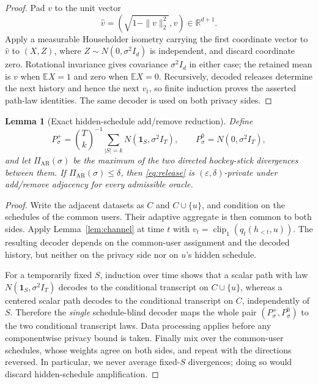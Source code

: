 \documentclass[11pt]{article}
\newtheorem{lemma}[theorem]{Lemma}
\theoremstyle{remark}
\newcommand{\R}{\mathbb{R}}
\newcommand{\clip}{\operatorname{clip}_1}
\begin{document}
\begin{proof}
Pad $v$ to the unit vector
\[
 \widehat v=(\sqrt{1-\|v\|_2^2},v)\in\R^{d+1}.
\]
Apply a measurable Householder isometry carrying the first coordinate vector
to $\widehat v$ to $(X,Z)$, where
$Z\sim N(0,\sigma^2I_d)$ is independent, and discard coordinate zero.
Rotational invariance gives covariance $\sigma^2I_d$ in either case; the
retained mean is $v$ when $\mathbb EX=1$ and zero when $\mathbb EX=0$.
Recursively, decoded releases determine the next history and hence the next
$v_t$, so finite induction proves the asserted path-law identities.  The same
decoder is used on both privacy sides.
\end{proof}

\begin{lemma}[Exact hidden-schedule add/remove reduction]\label{lem:ar-upper}
Define
\[
 P_\sigma^+
 =\binom Tk^{-1}\sum_{|S|=k}N(\mathbf1_S,\sigma^2I_T),
 \qquad
 P_\sigma^0=N(0,\sigma^2I_T),
\]
and let $\Pi_{\mathrm{AR}}(\sigma)$ be the maximum of the two directed
hockey-stick divergences between them.  If
$\Pi_{\mathrm{AR}}(\sigma)\leq\delta$, then \eqref{eq:release} is
$(\varepsilon,\delta)$-private under add/remove adjacency for every admissible
oracle.
\end{lemma}

\begin{proof}
Write the adjacent datasets as $C$ and $C\cup\{u\}$, and condition on the
schedules of the common users.  Their adaptive aggregate is then common to
both sides.  Apply Lemma~\ref{lem:channel} at time $t$ with
$v_t=\clip(q_t(h_{<t},u))$.  The resulting decoder depends on the common-user
assignment and the decoded history, but neither on the privacy side nor on
$u$'s hidden schedule.

For a temporarily fixed $S$, induction over time shows that a scalar path with
law $N(\mathbf1_S,\sigma^2I_T)$ decodes to the conditional transcript on
$C\cup\{u\}$, whereas a centered scalar path decodes to the conditional
transcript on $C$, independently of $S$.  Therefore the \emph{single}
schedule-blind decoder maps the whole pair $(P_\sigma^+,P_\sigma^0)$ to the
two conditional transcript laws.  Data processing applies before any
componentwise privacy bound is taken.  Finally mix over the common-user
schedules, whose weights agree on both sides, and repeat with the directions
reversed.  In particular, we never average fixed-$S$ divergences; doing so
would discard hidden-schedule amplification.
\end{proof}
\end{document}
